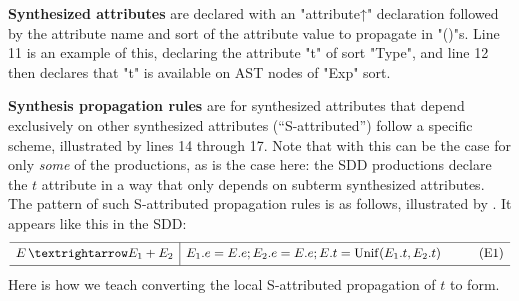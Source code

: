 \documentclass[11pt]{article} %
\begin{document}
\smallskip\noindent\textbf{Synthesized attributes} are declared with an "attribute↑" declaration followed by the
  attribute name and sort of the attribute value to propagate in "()"s. Line 11 is an example of
  this, declaring the attribute "t" of sort "Type", and line 12 then declares that "t" is available
  on AST nodes of "Exp" sort.

\smallskip\noindent\textbf{Synthesis propagation rules} are for synthesized attributes that depend exclusively on other
  synthesized attributes (``S-attributed'') follow a specific scheme, illustrated by lines 14
  through 17.  Note that with \HAX this can be the case for only \emph{some} of the productions, as
  is the case here: the SDD productions  declare the $t$ attribute in a way that only
  depends on subterm synthesized attributes.  The pattern of such S-attributed propagation rules is
  as follows, illustrated by .  It appears like this in the SDD:
  \begin{equation*}
    \begin{array}{r@{\,}l|lr}
      \hline\Bigstrut
      E &→ E_1 + E_2 & E_1.e=E.e; E_2.e=E.e; E.t = \op{Unif}(E_1.t, E_2.t) \qquad&\thetag{E1}\\[\jot]
      \hline
    \end{array}
  \end{equation*}
  Here is how we teach converting the local S-attributed propagation of $t$ to \HAX form.
\end{document}
